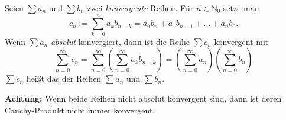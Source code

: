 Seien $\sum a_n$ und $\sum b_n$ zwei \textit{konvergente} Reihen. Für $n \in \mathbb{N}_0$ setze man
$$c_n := \sum_{k=0}^n a_k b_{n-k} = a_0 b_n + a_1 b_{n-1} + \dots + a_n b_0.$$
Wenn $\sum a_n$ \textit{absolut} konvergiert, dann ist die Reihe $\sum c_n$ konvergent mit
$$\sum_{n=0}^\infty c_n = \sum_{n=0}^\infty \left( \sum_{n=0}^\infty a_k b_{n-k} \right) = \left( \sum_{n=0}^\infty a_n \right) \left(\sum_{n=0}^\infty b_n \right)$$
$\sum c_n$ heißt das  der Reihen $\sum a_n$ und $\sum b_n$. \par
\textbf{Achtung:} Wenn beide Reihen nicht absolut konvergent sind, dann ist deren Cauchy-Produkt nicht immer konvergent.